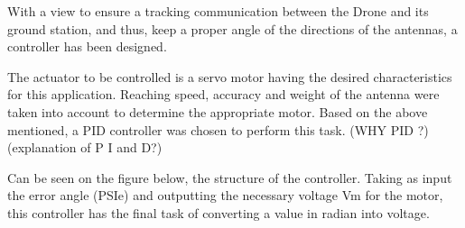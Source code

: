 With a view to ensure a tracking communication between the Drone and its ground station, and thus, keep a proper angle of the directions of the antennas, a controller has been designed.\par

The actuator to be controlled is a servo motor having the desired characteristics for this application.  Reaching speed, accuracy and weight of the antenna were taken into account to determine the appropriate motor. Based on the above mentioned, a PID controller was chosen to perform this task. (WHY PID ?) (explanation of P I and D?)\par

Can be seen on the figure below, the structure of the controller. Taking as input the error angle (PSIe) and outputting the necessary voltage Vm for the motor, this controller has the final task of converting a value in radian into voltage.\par